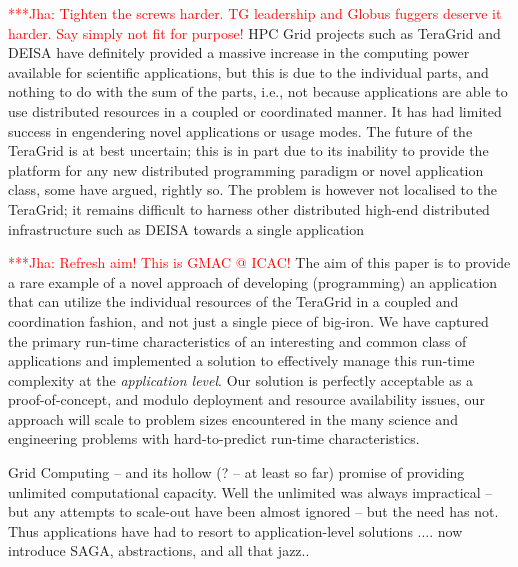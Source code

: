 \documentclass[conference,final]{IEEEtran}
\newcommand{\jhanote}[1]{ {\textcolor{red} { ***Jha: #1 }}}
\begin{document}

\jhanote{Tighten the screws harder. TG leadership and Globus fuggers
  deserve it harder. Say simply not fit for purpose!}  HPC Grid
projects such as TeraGrid and DEISA have definitely provided a massive
increase in the computing power available for scientific applications,
but this is due to the individual parts, and nothing to do with the
sum of the parts, i.e., not because applications are able to use
distributed resources in a coupled or coordinated manner.  It has had
limited success in engendering novel applications or usage modes.  The
future of the TeraGrid \cite{teragridfuture} is at best uncertain;
this is in part due to its inability to provide the platform for any
new distributed programming paradigm or novel application class, some
have argued, rightly so.  The problem is however not localised to the
TeraGrid; it remains difficult to harness other distributed high-end
distributed infrastructure such as DEISA towards a single application

\jhanote{Refresh aim! This is GMAC @ ICAC!}  The aim of this paper is
to provide a rare example of a novel approach of developing
(programming) an application that can utilize the individual resources
of the TeraGrid in a coupled and coordination fashion, and not just a
single piece of big-iron.  We have captured the primary run-time
characteristics of an interesting and common class of applications and
implemented a solution to effectively manage this run-time complexity
at the {\it application level}.  Our solution is perfectly acceptable
as a proof-of-concept, and modulo deployment and resource availability
issues, our approach will scale to problem sizes encountered in the
many science and engineering problems with hard-to-predict run-time
characteristics.

Grid Computing -- and its hollow (? -- at least so far) promise of
providing unlimited computational capacity. Well the unlimited was
always impractical -- but any attempts to scale-out have been almost
ignored -- but the need has not. Thus applications  have had to resort
to application-level solutions .... now introduce SAGA, abstractions,
and all that jazz..


\end{document}
